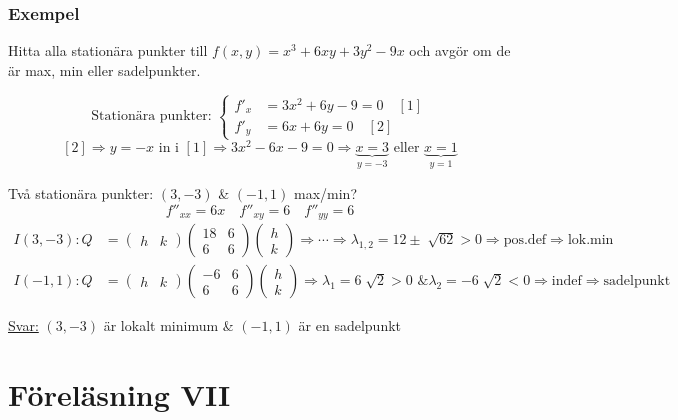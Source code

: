 \documentclass[a4paper]{article}
\let\oldsqrt\sqrt
\renewcommand*{\sqrt}[2][\ ]{\oldsqrt[#1]{#2} }
\begin{document}
\subsubsection{Exempel}
Hitta alla stationära punkter till $f(x,y) = x^3 + 6xy + 3y^2 - 9x$ och avgör om de är max, min eller sadelpunkter.

$$
	\text{Stationära punkter: }
	\left\{
	\begin{array}{rcl}
	f'_x &= 3x^2 + 6y - 9 = 0 \quad [1] \\
	f'_y &= 6x + 6y = 0 \quad [2]
	\end{array}\right.
$$
$$
	[2] \Rightarrow y = -x \text{ in i }[1] \Rightarrow 3x^2 - 6x - 9 = 0 \Rightarrow \underbrace{x=3}_{y=-3} \text{ eller } \underbrace{x=1}_{y=1}
$$

Två stationära punkter: $(3,-3)$ \& $(-1,1)$ max/min?
$$
	f''_{xx} = 6x \quad f''_{xy} = 6 \quad f''_{yy} = 6
$$
\begin{align*}
	I(3,-3): Q &=
	\begin{pmatrix}
		h & k
	\end{pmatrix}
	\begin{pmatrix}
		18 & 6 \\
		6 & 6
	\end{pmatrix}
	\begin{pmatrix}
		h \\
		k
	\end{pmatrix}
	\Rightarrow \cdots \Rightarrow \lambda_{1,2} = 12 \pm \sqrt{62} > 0 \Rightarrow \text{pos.def} \Rightarrow \text{lok.min} \\
	I(-1,1): Q &=
	\begin{pmatrix}
		h & k
	\end{pmatrix}
	\begin{pmatrix}
		-6 & 6 \\
		6 & 6
	\end{pmatrix}
	\begin{pmatrix}
		h \\
		k
	\end{pmatrix}
	\Rightarrow \lambda_1 = 6\sqrt{2} > 0 \text{ \& } \lambda_2 = -6\sqrt{2} < 0 \Rightarrow \text{indef} \Rightarrow \text{sadelpunkt}
\end{align*}

\underline{Svar:} $(3,-3)$ är lokalt minimum \& $(-1,1)$ är en sadelpunkt





\newpage
\section{Föreläsning VII}
\end{document}

